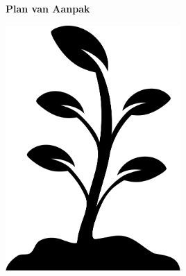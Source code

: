 \begin{titlepage}
   \begin{center}
       \vspace*{1cm}

		\Huge
		\textbf{Plan van Aanpak}

		\vspace{0.5cm}
		
		\LARGE
		\ProjectName
            
		\vspace{1.5cm}

		\textbf{\StudentName}

		\vspace{3.0cm}
		
		\includegraphics[width=0.5\textwidth]{Content/Cover/Coverimage.png}
   \end{center}
\end{titlepage}
